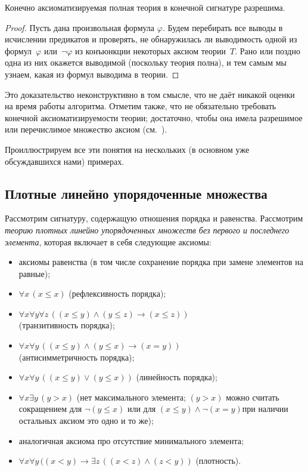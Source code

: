 \begin{theorem}
        \label{complete-decidable}%
Конечно аксиоматизируемая полная теория в конечной сигнатуре
разрешима.
\end{theorem}

\begin{proof}
Пусть дана произвольная формула $\varphi$. Будем перебирать все
выводы в исчислении предикатов и проверять, не обнаружилась ли
выводимость одной из формул~$\varphi$ или~$\lnot\varphi$ из
конъюнкции некоторых аксиом теории~$T$. Рано или поздно одна из
них окажется выводимой (поскольку теория полна), и тем самым мы
узнаем, какая из формул выводима в теории.
\end{proof}

Это доказательство неконструктивно в том смысле, что не даёт
никакой оценки на время работы алгоритма. Отметим также, что не
обязательно требовать конечной аксиоматизируемости теории;
достаточно, чтобы она имела разрешимое или перечислимое
множество аксиом (см.~\cite{computable-functions}).

Проиллюстрируем все эти понятия на нескольких (в основном уже
обсуждавшихся нами) примерах.

\subsection*{Плотные линейно упорядоченные множества}

Рассмотрим сигнатуру, содержащую
отношения порядка и равенства. Рассмотрим \emph{теорию плотных
линейно упорядоченных множеств без первого и последнего
элемента},%
которая включает в себя следующие аксиомы:
\begin{itemize}
        \item
аксиомы равенства (в том числе
сохранение порядка при замене элементов на равные);
        \item
$\forall x\,(x\le x)$
(рефлексивность порядка);
        \item
$\forall x\forall y\forall z\, ((x\le y)\land (y\le z)\to (x\le z))$
\\(транзитивность порядка);
        \item
$\forall x \forall y\,((x\le y)\land (y\le x)\to (x=y))$
\\(антисимметричность порядка);
           \item
$\forall x \forall y \,((x\le y)\lor (y\le x))$
(линейность порядка);
        \item
$\forall x \exists y\, (y >x)$ (нет максимального элемента;
$(y>x)$ можно считать сокращением для $\lnot (y\le x)$ или
для $(x\le y)\land\lnot (x=y)$\т при наличии остальных
аксиом это одно и то же);
        \item
аналогичная аксиома про отсутствие минимального элемента;
        \item
$\forall x\forall y\, ((x<y)\to \exists z\,((x<z)\land (z<y))$
(плотность).
\end{itemize}

